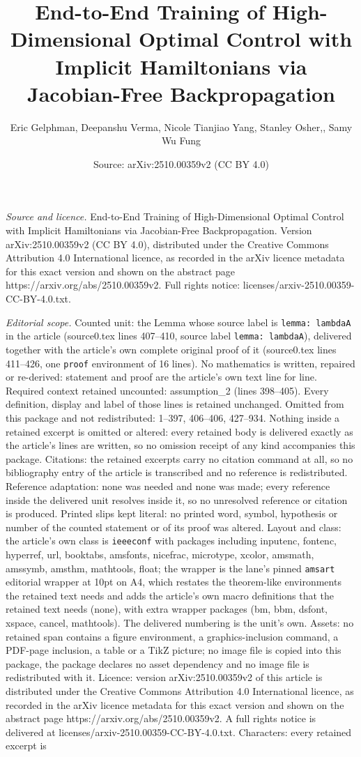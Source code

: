 \documentclass[10pt,a4paper]{amsart}
\title[End-to-End Training of High-Dimensional Optimal Control with]{End-to-End Training of High-Dimensional Optimal Control with Implicit Hamiltonians via Jacobian-Free Backpropagation}
\author{Eric Gelphman, Deepanshu Verma, Nicole Tianjiao Yang, Stanley Osher,, Samy Wu Fung}
\date{Source: arXiv:2510.00359v2 (CC BY 4.0)}
\begin{document}
\maketitle

\noindent\emph{Source and licence.} End-to-End Training of High-Dimensional Optimal Control with Implicit Hamiltonians via Jacobian-Free Backpropagation. Version arXiv:2510.00359v2 (CC BY 4.0), distributed under the Creative Commons Attribution 4.0 International licence, as recorded in the arXiv licence metadata for this exact version and shown on the abstract page https://arxiv.org/abs/2510.00359v2. Full rights notice: licenses/arxiv-2510.00359-CC-BY-4.0.txt.\par\smallskip

\noindent\textit{Editorial scope.} Counted unit: the Lemma whose source label is \texttt{lemma: lambdaA} in the article (source0.tex lines 407--410, source label \texttt{lemma: lambdaA}), delivered together with the article's own complete original proof of it (source0.tex lines 411--426, one \texttt{proof} environment of 16 lines). No mathematics is written, repaired or re-derived: statement and proof are the article's own text line for line. Required context retained uncounted: assumption\_2 (lines 398--405). Every definition, display and label of those lines is retained unchanged. Omitted from this package and not redistributed: 1--397, 406--406, 427--934. Nothing inside a retained excerpt is omitted or altered: every retained body is delivered exactly as the article's lines are written, so no omission receipt of any kind accompanies this package. Citations: the retained excerpts carry no citation command at all, so no bibliography entry of the article is transcribed and no reference is redistributed. Reference adaptation: none was needed and none was made; every reference inside the delivered unit resolves inside it, so no unresolved reference or citation is produced. Printed slips kept literal: no printed word, symbol, hypothesis or number of the counted statement or of its proof was altered. Layout and class: the article's own class is \texttt{ieeeconf} with packages including inputenc, fontenc, hyperref, url, booktabs, amsfonts, nicefrac, microtype, xcolor, amsmath, amssymb, amsthm, mathtools, float; the wrapper is the lane's pinned \texttt{amsart} editorial wrapper at 10pt on A4, which restates the theorem-like environments the retained text needs and adds the article's own macro definitions that the retained text needs (none), with extra wrapper packages (bm, bbm, dsfont, xspace, cancel, mathtools). The delivered numbering is the unit's own. Assets: no retained span contains a figure environment, a graphics-inclusion command, a PDF-page inclusion, a table or a TikZ picture; no image file is copied into this package, the package declares no asset dependency and no image file is redistributed with it. Licence: version arXiv:2510.00359v2 of this article is distributed under the Creative Commons Attribution 4.0 International licence, as recorded in the arXiv licence metadata for this exact version and shown on the abstract page https://arxiv.org/abs/2510.00359v2. A full rights notice is delivered at licenses/arxiv-2510.00359-CC-BY-4.0.txt. Characters: every retained excerpt is 
\end{document}
